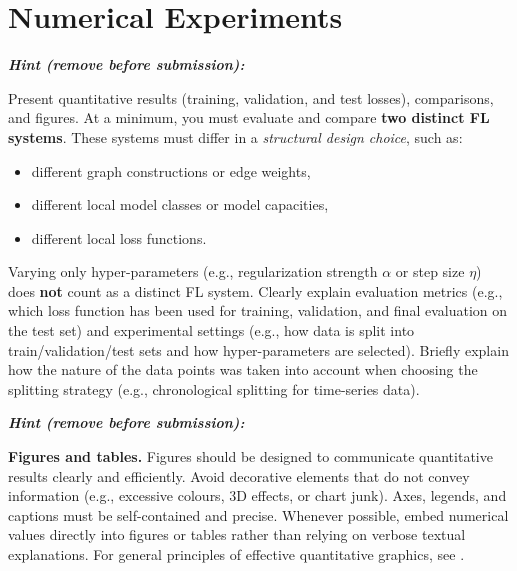 \documentclass{article}
\newenvironment{hint}{%
	\par\medskip\noindent
	\begin{minipage}[t]{\dimexpr\columnwidth-8mm}%
	\raggedright\itshape
	\textbf{Hint (remove before submission):}\space
}{%
	\end{minipage}\par\medskip
}
\begin{document}
\section{Numerical Experiments}
\label{sec:experiments}

\begin{hint}
	Present quantitative results (training, validation, and test losses),
	comparisons, and figures.
	At a minimum, you must evaluate and compare \textbf{two distinct FL systems}.
	These systems must differ in a \emph{structural design choice}, such as:
	\begin{itemize}
		\item different graph constructions or edge weights,
		\item different local model classes or model capacities,
		\item different local loss functions.
	\end{itemize}
	Varying only hyper-parameters (e.g., regularization strength $\alpha$ or step size $\eta$)
	does \textbf{not} count as a distinct FL system.
	Clearly explain evaluation metrics (e.g., which loss function has been used
	for training, validation, and final evaluation on the test set) and experimental
	settings (e.g., how data is split into train/validation/test sets and how hyper-parameters
	are selected). Briefly explain how the nature of the data points was taken into
	account when choosing the splitting strategy (e.g., chronological splitting
	for time-series data).
\end{hint}

\begin{hint}
	\textbf{Figures and tables.}
	Figures should be designed to communicate quantitative results clearly and efficiently.
	Avoid decorative elements that do not convey information (e.g., excessive colours, 3D effects,
	or chart junk). Axes, legends, and captions must be self-contained and precise.
	Whenever possible, embed numerical values directly into figures or tables rather
	than relying on verbose textual explanations. For general principles of effective
	quantitative graphics, see \cite{TufteVDQI}.
\end{hint}
\end{document}

